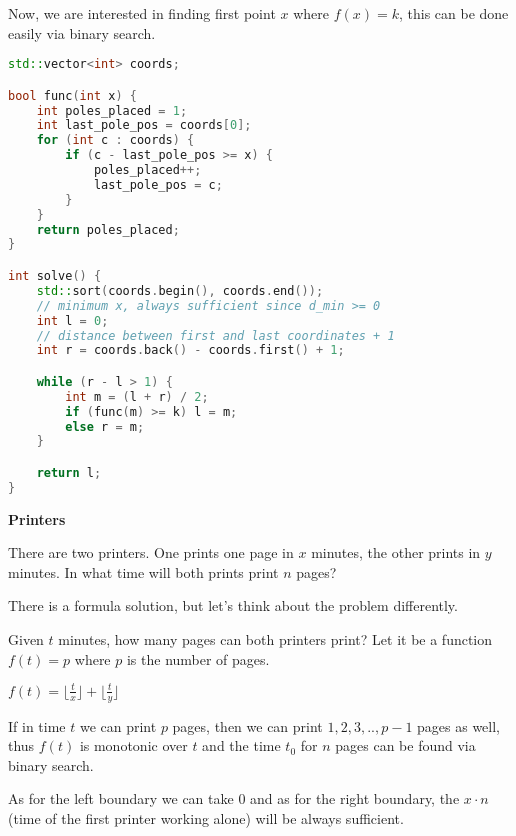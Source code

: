 \begin{solution}
    Now, we are interested in finding first point $x$ where $f(x) = k$, this can be done easily via binary search.

\begin{lstlisting}[language=C++]
std::vector<int> coords;

bool func(int x) {
    int poles_placed = 1;
    int last_pole_pos = coords[0];
    for (int c : coords) {
        if (c - last_pole_pos >= x) {
            poles_placed++;
            last_pole_pos = c;
        }
    }
    return poles_placed;
}

int solve() {
    std::sort(coords.begin(), coords.end());
    // minimum x, always sufficient since d_min >= 0
    int l = 0;
    // distance between first and last coordinates + 1
    int r = coords.back() - coords.first() + 1;

    while (r - l > 1) {
        int m = (l + r) / 2;
        if (func(m) >= k) l = m;
        else r = m;
    }

    return l;
}
\end{lstlisting}

\end{solution}


\begin{problem}\textbf{Printers}

    There are two printers. One prints one page in $x$ minutes, the other prints in $y$ minutes. In what time will both prints print $n$ pages?

\end{problem}

\begin{solution}

    There is a formula solution, but let's think about the problem differently.

    Given $t$ minutes, how many pages can both printers print? Let it be a function $f(t) = p$ where $p$ is the number of pages.

    $f(t) = \lfloor \frac{t}{x} \rfloor + \lfloor \frac{t}{y} \rfloor$

    If in time $t$ we can print $p$ pages, then we can print $1, 2, 3, .., p-1$ pages as well, thus $f(t)$ is monotonic over $t$ and the time $t_0$ for $n$ pages can be found via binary search.

    As for the left boundary we can take $0$ and as for the right boundary, the $x \cdot n$ (time of the first printer working alone) will be always sufficient.

\end{solution}

